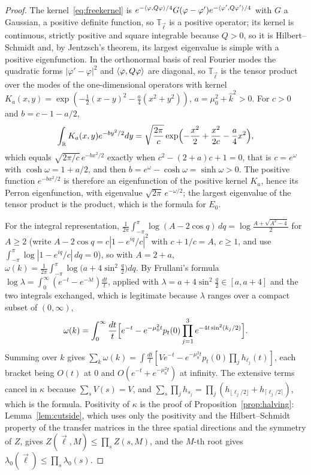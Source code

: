 \begin{proof}
The kernel~\eqref{eq:freekernel} is $e^{-\langle \varphi,Q\varphi\rangle/4}G(\varphi-
\varphi')e^{-\langle \varphi',Q\varphi'\rangle/4}$ with $G$ a Gaussian, a positive
definite function, so $\mathbb T_{\vec\ell}$ is a positive operator; its
kernel is continuous, strictly positive and square integrable because $Q>0$,
so it is Hilbert--Schmidt and, by Jentzsch's theorem, its largest eigenvalue
is simple with a positive eigenfunction. In the orthonormal basis of
real Fourier modes the quadratic forms $|\varphi'-\varphi|^2$ and
$\langle \varphi,Q\varphi\rangle$ are diagonal, so $\mathbb T_{\vec\ell}$ is the tensor
product over the modes of the one-dimensional operators with kernel
$K_a(x,y)=\exp(-\frac12(x-y)^2-\frac a4(x^2+y^2))$, $a=\mu_0^2+\hat k^2>0$. For
$c>0$ and $b=c-1-a/2$,
\[
\int_{\mathbb{R}} K_a(x,y)e^{-by^2/2}dy=\sqrt{\frac{2\pi}c}\exp\Bigl(-\frac{x^2}2+
\frac{x^2}{2c}-\frac a4x^2\Bigr),
\]
which equals $\sqrt{2\pi/c}\,e^{-bx^2/2}$ exactly when $c^2-(2+a)c+1=0$, that
is $c=e^{\omega}$ with $\cosh\omega=1+a/2$, and then $b=e^{\omega}-\cosh\omega=\sinh\omega>0$. The positive function $e^{-bx^2/2}$ is therefore an
eigenfunction of the positive kernel $K_a$, hence its Perron eigenfunction,
with eigenvalue $\sqrt{2\pi}\,e^{-\omega/2}$; the largest eigenvalue of the
tensor product is the product, which is the formula for $E_0$.

For the integral representation, $\frac1{2\pi}\int_{-\pi}^\pi\log(A-2\cos q)
\,dq=\log\frac{A+\sqrt{A^2-4}}2$ for $A\ge2$ (write $A-2\cos q=c|1-e^{iq}/c|^2$
with $c+1/c=A$, $c\ge1$, and use $\int_{-\pi}^{\pi}\log|1-e^{iq}/c|\,dq=0$), so with
$A=2+a$,
$\omega(k)=\frac1{2\pi}\int_{-\pi}^{\pi}\log\bigl(a+4\sin^2\tfrac q2\bigr)dq$.
By Frullani's formula $\log\lambda=\int_0^\infty(e^{-t}-e^{-\lambda t})\frac
{dt}t$, applied with $\lambda=a+4\sin^2\frac q2\in[a,a+4]$ and the two
integrals exchanged, which is legitimate because $\lambda$ ranges over a
compact subset of $(0,\infty)$,
\[
\omega(k)=\int_0^\infty\frac{dt}t\Bigl[e^{-t}-e^{-\mu_0^2t}p_t(0)\prod_{j=1}^3
e^{-4t\sin^2(k_j/2)}\Bigr].
\]
Summing over $k$ gives $\sum_k\omega(k)=\int\frac{dt}t[Ve^{-t}-e^{-\mu_0^2t}
p_t(0)\prod_jh_{\ell_j}(t)]$, each bracket being $O(t)$ at $0$ and $O(e^{-t}+
e^{-\mu_0^2t})$ at infinity. The extensive terms cancel in $\kappa$ because
$\sum_sV(s)=V$, and $\sum_s\prod_jh_{s_j}=\prod_j(h_{\lfloor\ell_j/2\rfloor}+
h_{\lceil\ell_j/2\rceil})$, which is the formula. Positivity of $\kappa$ is
the proof of Proposition~\ref{prop:halving}: Lemma~\ref{lem:cutside}, which
uses only the positivity and the Hilbert--Schmidt property of the transfer
matrices in the three spatial directions and the symmetry of $Z$, gives
$Z(\vec\ell,M)\le\prod_sZ(s,M)$, and the $M$-th root gives $\lambda_0(\vec
\ell)\le\prod_s\lambda_0(s)$.


\end{proof}
